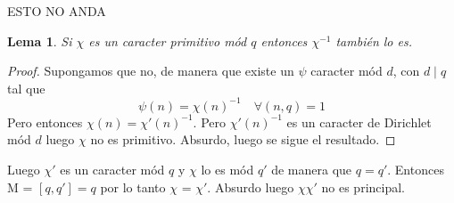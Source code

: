 \documentclass[12pt, a4paper]{article}
\theoremstyle{plain}
\newtheorem{lemma}[theorem]{Lema}
\theoremstyle{definition}
\theoremstyle{remark}
\begin{document}
ESTO NO ANDA
    \begin{lemma}
        Si $\chi$ es un caracter primitivo mód $q$ entonces $\chi^{-1}$ también lo es.
    \end{lemma}
    \begin{proof}
        Supongamos que no, de manera que existe un $\psi$ caracter mód $d$, con $d\mid q$ tal que 
        \[
        \psi(n) = \chi(n)^{-1} \quad \forall (n,q) = 1
        \]
        Pero entonces $\chi(n) = \chi'(n)^{-1}$. Pero $\chi'(n)^{-1}$ es un caracter de Dirichlet mód $d$ luego $\chi$ no es 
        primitivo. Absurdo, luego se sigue el resultado.
    \end{proof}
    Luego $\chi'$ es un caracter mód $q$ y $\chi$ lo es mód $q'$ de manera que $q = q'$. Entonces M = $[q,q'] = q$
    por lo tanto $\chi$ = $\chi'$. Absurdo luego $\chi\chi'$ no es principal.
\end{document}

